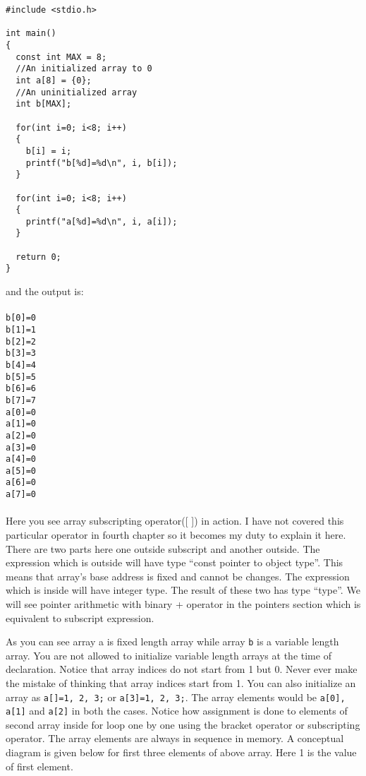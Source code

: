 \begin{verbatim}
#include <stdio.h>

int main()
{
  const int MAX = 8;
  //An initialized array to 0
  int a[8] = {0};
  //An uninitialized array
  int b[MAX];

  for(int i=0; i<8; i++)
  {
    b[i] = i;
    printf("b[%d]=%d\n", i, b[i]);
  }

  for(int i=0; i<8; i++)
  {
    printf("a[%d]=%d\n", i, a[i]);
  }

  return 0;
}
\end{verbatim}
and the output is:
\\\\\texttt{b[0]=0\\
b[1]=1\\
b[2]=2\\
b[3]=3\\
b[4]=4\\
b[5]=5\\
b[6]=6\\
b[7]=7\\
a[0]=0\\
a[1]=0\\
a[2]=0\\
a[3]=0\\
a[4]=0\\
a[5]=0\\
a[6]=0\\
a[7]=0\\\\}
Here you see array subscripting operator([ ]) in action. I have not covered this
particular operator in fourth chapter so it becomes my duty to explain it
here. There are two parts here one outside subscript and another outside. The
expression which is outside will have type “const pointer to object type”. This
means that array’s base address is fixed and cannot be changes. The expression
which is inside will have integer type. The result of these two has type
``type''. We will see pointer arithmetic with binary + operator in the pointers
section which is equivalent to subscript expression.

As you can see array a is fixed length array while array \texttt{b} is a
variable length array. You are not allowed to initialize variable length arrays
at the time of declaration. Notice that array indices do not start from 1 but
0. Never ever make the mistake of thinking that array indices start from 1. You
can also initialize an array as \texttt{a[]={1, 2, 3};} or \texttt{a[3]={1, 2,
    3};}. The array elements would be \texttt{a[0], a[1]} and \texttt{a[2]} in
both the cases. Notice how assignment is done to elements of second array
inside for loop one by one using the bracket operator or subscripting
operator. The array elements are always in sequence in memory. A conceptual
diagram is given below for first three elements of above array. Here 1 is the
value of first element.

